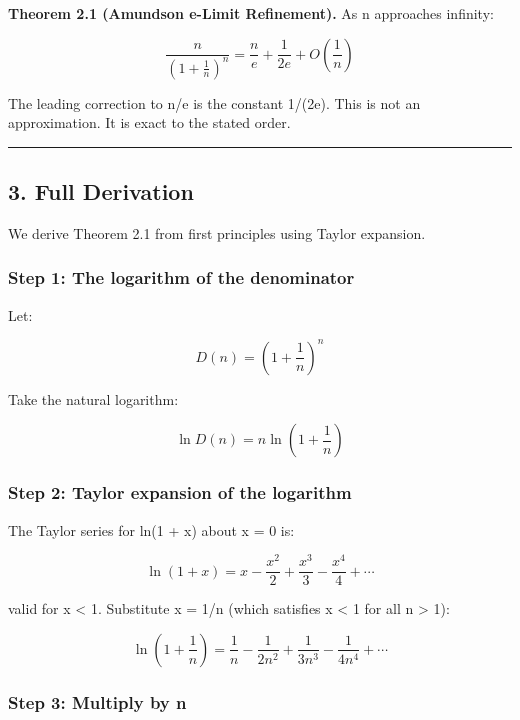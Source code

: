 \documentclass[
]{article}
\begin{document}
\textbf{Theorem 2.1 (Amundson e-Limit Refinement).} As n approaches
infinity:

\[\frac{n}{\left(1 + \frac{1}{n}\right)^n} = \frac{n}{e} + \frac{1}{2e} + O\!\left(\frac{1}{n}\right)\]

The leading correction to n/e is the constant 1/(2e). This is not an
approximation. It is exact to the stated order.

\begin{center}\rule{0.5\linewidth}{0.5pt}\end{center}

\subsection{3. Full Derivation}\label{full-derivation}

We derive Theorem 2.1 from first principles using Taylor expansion.

\subsubsection{Step 1: The logarithm of the
denominator}\label{step-1-the-logarithm-of-the-denominator}

Let:

\[D(n) = \left(1 + \frac{1}{n}\right)^n\]

Take the natural logarithm:

\[\ln D(n) = n \ln\!\left(1 + \frac{1}{n}\right)\]

\subsubsection{Step 2: Taylor expansion of the
logarithm}\label{step-2-taylor-expansion-of-the-logarithm}

The Taylor series for ln(1 + x) about x = 0 is:

\[\ln(1 + x) = x - \frac{x^2}{2} + \frac{x^3}{3} - \frac{x^4}{4} + \cdots\]

valid for \textbar x\textbar{} \textless{} 1. Substitute x = 1/n (which
satisfies \textbar x\textbar{} \textless{} 1 for all n \textgreater{}
1):

\[\ln\!\left(1 + \frac{1}{n}\right) = \frac{1}{n} - \frac{1}{2n^2} + \frac{1}{3n^3} - \frac{1}{4n^4} + \cdots\]

\subsubsection{Step 3: Multiply by n}\label{step-3-multiply-by-n}
\end{document}
